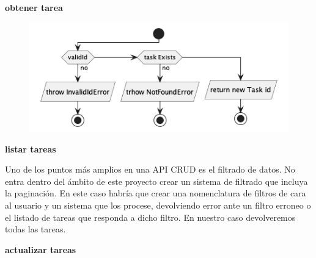 \textbf{obtener tarea}

\begin{figure}[H]
    \centering
    \includegraphics[height=0.3\textheight]{part/memoria_descriptiva/getTaskUseCase}
    \caption[Diagrama de objetos de dominio]{}\label{fig:getTaskUseCase}
\end{figure}

\textbf{listar tareas}

Uno de los puntos más amplios en una API CRUD es el filtrado de datos. No entra dentro del ámbito de este proyecto crear un sistema de filtrado que incluya la paginación. En este caso habría que crear una nomenclatura de filtros de cara al usuario y un sistema que los procese, devolviendo error ante un filtro erroneo o el listado de tareas que responda a dicho filtro. En nuestro caso devolveremos todas las tareas.

\textbf{actualizar tareas}

